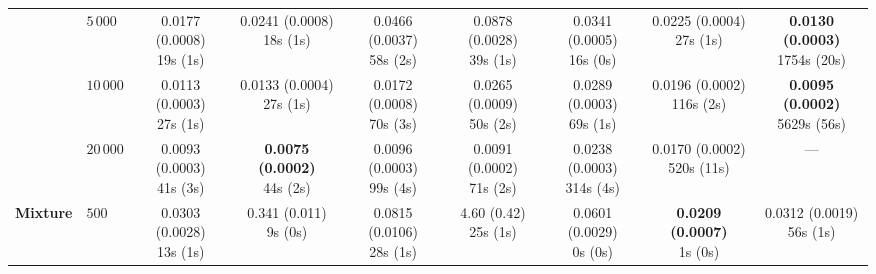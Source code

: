 \begin{table}[htbp]
{\begin{tabular}{llccccccc}
 & $5{\,}000$ & \makecell{0.0177 (0.0008) \\ \scriptsize 19s (1s)} & \makecell{0.0241 (0.0008) \\ \scriptsize 18s (1s)} & \makecell{0.0466 (0.0037) \\ \scriptsize 58s (2s)} & \makecell{0.0878 (0.0028) \\ \scriptsize 39s (1s)} & \makecell{0.0341 (0.0005) \\ \scriptsize 16s (0s)} & \makecell{0.0225 (0.0004) \\ \scriptsize 27s (1s)} & \makecell{\textbf{0.0130 (0.0003)} \\ \scriptsize 1754s (20s)} \\
 & $10{\,}000$ & \makecell{0.0113 (0.0003) \\ \scriptsize 27s (1s)} & \makecell{0.0133 (0.0004) \\ \scriptsize 27s (1s)} & \makecell{0.0172 (0.0008) \\ \scriptsize 70s (3s)} & \makecell{0.0265 (0.0009) \\ \scriptsize 50s (2s)} & \makecell{0.0289 (0.0003) \\ \scriptsize 69s (1s)} & \makecell{0.0196 (0.0002) \\ \scriptsize 116s (2s)} & \makecell{\textbf{0.0095 (0.0002)} \\ \scriptsize 5629s (56s)} \\
 & $20{\,}000$ & \makecell{0.0093 (0.0003) \\ \scriptsize 41s (3s)} & \makecell{\textbf{0.0075 (0.0002)} \\ \scriptsize 44s (2s)} & \makecell{0.0096 (0.0003) \\ \scriptsize 99s (4s)} & \makecell{0.0091 (0.0002) \\ \scriptsize 71s (2s)} & \makecell{0.0238 (0.0003) \\ \scriptsize 314s (4s)} & \makecell{0.0170 (0.0002) \\ \scriptsize 520s (11s)} & --- \\
\hline
\textbf{Mixture} & $500$ & \makecell{0.0303 (0.0028) \\ \scriptsize 13s (1s)} & \makecell{0.341 (0.011) \\ \scriptsize 9s (0s)} & \makecell{0.0815 (0.0106) \\ \scriptsize 28s (1s)} & \makecell{4.60 (0.42) \\ \scriptsize 25s (1s)} & \makecell{0.0601 (0.0029) \\ \scriptsize 0s (0s)} & \makecell{\textbf{0.0209 (0.0007)} \\ \scriptsize 1s (0s)} & \makecell{0.0312 (0.0019) \\ \scriptsize 56s (1s)} \\

\end{tabular}}
\end{table}
